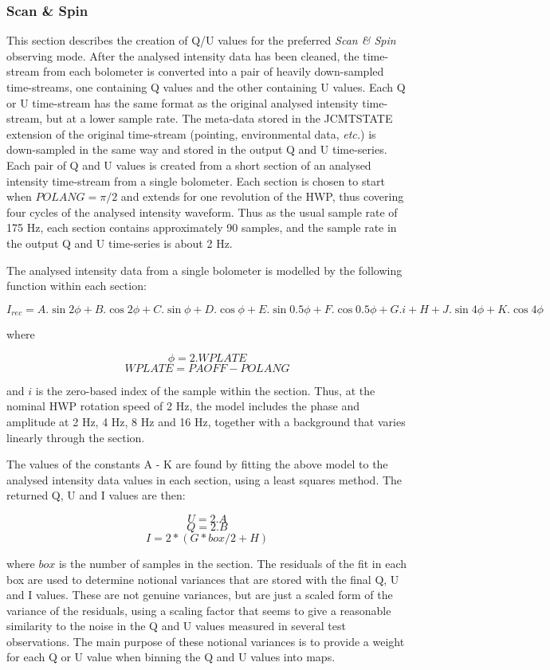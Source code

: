 \documentclass[twoside,11pt]{starlink}
\begin{document}
\subsubsection{Scan \& Spin}
\label{sec:fit}
This section describes the creation of Q/U values for the preferred
\emph{Scan \& Spin} observing mode. After the analysed intensity data
has been cleaned, the time-stream from each bolometer is converted into a
pair of heavily down-sampled time-streams, one containing Q values and the
other containing U values. Each Q or U time-stream has the same format as the
original analysed intensity time-stream, but at a lower sample rate.  The
meta-data stored in the JCMTSTATE extension of the original time-stream
(pointing, environmental data, \emph{etc.})  is down-sampled in the same
way and stored in the output Q and U time-series. Each pair of Q and U values
is created from a short section of an analysed intensity time-stream from a
single bolometer. Each section is chosen to start when $POLANG = \pi/2$ and
extends for one revolution of the HWP, thus covering four cycles of the
analysed intensity waveform. Thus as the usual sample rate of 175 Hz,
each section contains approximately 90 samples, and the sample rate in the
output Q and U time-series is about 2 Hz.

The analysed intensity data from a single bolometer is modelled by the
following function within each section:

\[ I_{rec} = A.\sin 2\phi + B.\cos 2\phi + C.\sin \phi + D.\cos \phi +
             E.\sin 0.5\phi + F.\cos 0.5\phi + G.i + H + J.\sin 4\phi +
             K.\cos 4\phi \]

where

\[ \phi = 2.WPLATE \]
\[ WPLATE = PAOFF - POLANG \]

and $i$ is the zero-based index of the sample within the section. Thus,
at the nominal HWP rotation speed of 2 Hz, the model includes the phase
and amplitude at 2 Hz, 4 Hz, 8 Hz and 16 Hz, together with a background
that varies linearly through the section.

The values of the constants A - K are found by fitting the above model to
the analysed intensity data values in each section, using a least squares
method. The returned Q, U and I values are then:

\[ U = 2.A \]
\[ Q = 2.B \]
\[ I = 2*( G*box/2 + H ) \]

where $box$ is the number of samples in the section. The residuals of the
fit in each box are used to determine notional variances that are stored
with the final Q, U and I values. These are not genuine variances, but are
just a scaled form of the variance of the residuals, using a scaling factor
that seems to give a reasonable similarity to the noise in the Q and U
values measured in several test observations. The main purpose of these
notional variances is to provide a weight for each Q or U value when
binning the Q and U values into maps.
\end{document}
